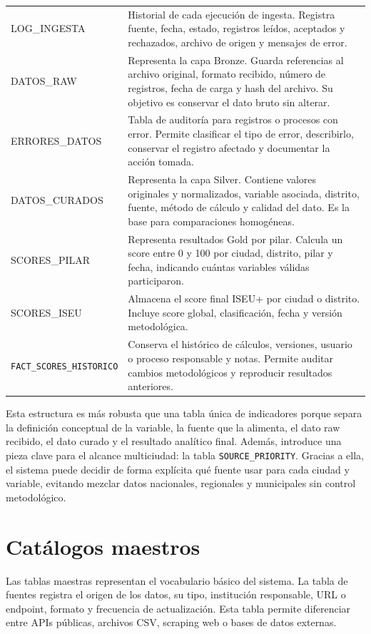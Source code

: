 \begin{longtable}{>{\raggedright\arraybackslash}p{} >{\raggedright\arraybackslash}p{}}
LOG\_INGESTA & Historial de cada ejecución de ingesta. Registra fuente, fecha, estado, registros leídos, aceptados y rechazados, archivo de origen y mensajes de error. \\
DATOS\_RAW & Representa la capa Bronze. Guarda referencias al archivo original, formato recibido, número de registros, fecha de carga y hash del archivo. Su objetivo es conservar el dato bruto sin alterar. \\
ERRORES\_DATOS & Tabla de auditoría para registros o procesos con error. Permite clasificar el tipo de error, describirlo, conservar el registro afectado y documentar la acción tomada. \\
DATOS\_CURADOS & Representa la capa Silver. Contiene valores originales y normalizados, variable asociada, distrito, fuente, método de cálculo y calidad del dato. Es la base para comparaciones homogéneas. \\
SCORES\_PILAR & Representa resultados Gold por pilar. Calcula un score entre 0 y 100 por ciudad, distrito, pilar y fecha, indicando cuántas variables válidas participaron. \\
SCORES\_ISEU & Almacena el score final ISEU+ por ciudad o distrito. Incluye score global, clasificación, fecha y versión metodológica. \\
\texttt{FACT\_SCORES\_}\newline\texttt{HISTORICO} & Conserva el histórico de cálculos, versiones, usuario o proceso responsable y notas. Permite auditar cambios metodológicos y reproducir resultados anteriores. \\
\bottomrule
\end{longtable}

Esta estructura es más robusta que una tabla única de indicadores porque separa la definición conceptual de la variable, la fuente que la alimenta, el dato raw recibido, el dato curado y el resultado analítico final. Además, introduce una pieza clave para el alcance multiciudad: la tabla \texttt{SOURCE\_PRIORITY}. Gracias a ella, el sistema puede decidir de forma explícita qué fuente usar para cada ciudad y variable, evitando mezclar datos nacionales, regionales y municipales sin control metodológico.

\section{Catálogos maestros}

Las tablas maestras representan el vocabulario básico del sistema. La tabla de fuentes registra el origen de los datos, su tipo, institución responsable, URL o endpoint, formato y frecuencia de actualización. Esta tabla permite diferenciar entre APIs públicas, archivos CSV, scraping web o bases de datos externas.

